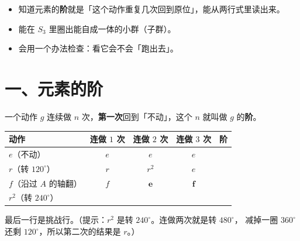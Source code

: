 

\begin{mubiao}
  \begin{itemize}
    \item 知道元素的\textbf{阶}就是「这个动作重复几次回到原位」，能从两行式里读出来。
    \item 能在 \(S_3\) 里圈出能自成一体的小群（子群）。
    \item 会用一个办法检查：看它会不会「跑出去」。
  \end{itemize}
\end{mubiao}

\section*{一、元素的阶}

\begin{definition}[元素的阶]
  一个动作 \(g\) 连续做 \(n\) 次，\textbf{第一次}回到「不动」，这个 \(n\)
  就叫做 \(g\) 的\textbf{阶}。
\end{definition}

\begin{dongshou}
  \begin{center}
  \begin{tabular}{@{}lccc|c@{}}
    \toprule
    动作 & 连做 \(1\) 次 & 连做 \(2\) 次 & 连做 \(3\) 次 & 阶 \\
    \midrule
    \rule{0pt}{2.8ex}\(e\)（不动） & \(e\) & \(e\) & \(e\) & \hspace{1.4em} \\
    \rule{0pt}{2.8ex}\(r\)（转 \(120^\circ\)） & \(r\) & \(r^2\) & \(e\) & \hspace{1.4em} \\
    \rule{0pt}{2.8ex}\(f\)（沿过 \(A\) 的轴翻） & \(f\) & \(\mathbf{e}\) & \(\mathbf{f}\) & \hspace{1.4em} \\
    \rule{0pt}{2.8ex}\(r^2\)（转 \(240^\circ\)） & & & & \hspace{1.4em} \\
    \bottomrule
  \end{tabular}
  \end{center}
  最后一行是挑战行。（提示：\(r^2\) 是转 \(240^\circ\)。连做两次就是转 \(480^\circ\)，
  减掉一圈 \(360^\circ\) 还剩 \(120^\circ\)，所以第二次的结果是 \(r\)。）
\end{dongshou}

